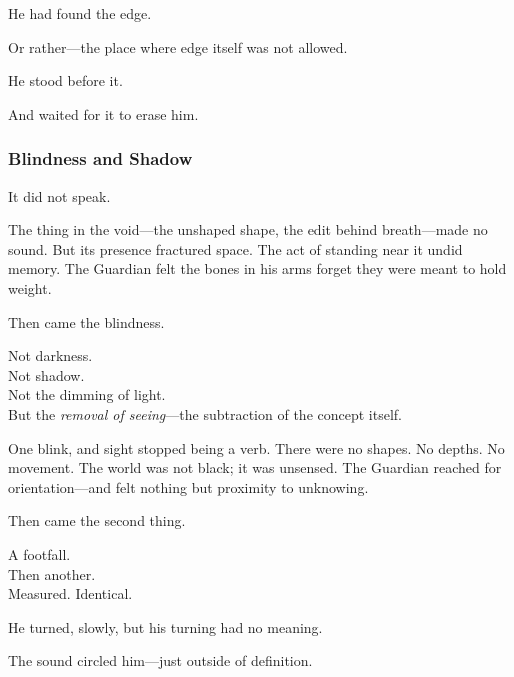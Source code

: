 \documentclass[12pt]{article}
\begin{document}
\vspace{0.5em}
He had found the edge.

\vspace{0.5em}
Or rather---the place where edge itself was not allowed.

\vspace{0.5em}
He stood before it.

\vspace{0.5em}
And waited for it to erase him.

\dotfill

\subsubsection*{Blindness and Shadow}

It did not speak.

\vspace{0.5em}
The thing in the void---the unshaped shape, the edit behind breath---made no sound. But its presence fractured space. The act of standing near it undid memory. The Guardian felt the bones in his arms forget they were meant to hold weight.

\vspace{0.5em}
Then came the blindness.

\vspace{0.5em}
Not darkness.\\
Not shadow.\\
Not the dimming of light.\\
But the \textit{removal of seeing}---the subtraction of the concept itself.

\vspace{0.5em}
One blink, and sight stopped being a verb. There were no shapes. No depths. No movement. The world was not black; it was unsensed. The Guardian reached for orientation---and felt nothing but proximity to unknowing.

\vspace{0.5em}
Then came the second thing.

\vspace{0.5em}
A footfall.\\
Then another.\\
Measured. Identical.

\vspace{0.5em}
He turned, slowly, but his turning had no meaning.

\vspace{0.5em}
The sound circled him---just outside of definition.
\end{document}
